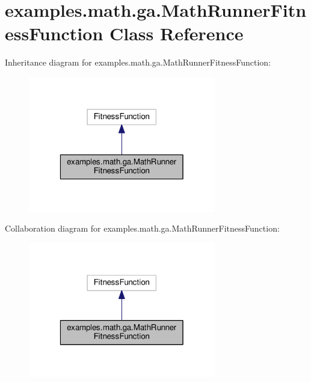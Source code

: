 \hypertarget{classexamples_1_1math_1_1ga_1_1_math_runner_fitness_function}{\section{examples.\-math.\-ga.\-Math\-Runner\-Fitness\-Function Class Reference}
\label{classexamples_1_1math_1_1ga_1_1_math_runner_fitness_function}
}


Inheritance diagram for examples.\-math.\-ga.\-Math\-Runner\-Fitness\-Function\-:
\nopagebreak
\begin{figure}[H]
\begin{center}
\leavevmode
\includegraphics[width=232pt]{classexamples_1_1math_1_1ga_1_1_math_runner_fitness_function__inherit__graph}
\end{center}
\end{figure}


Collaboration diagram for examples.\-math.\-ga.\-Math\-Runner\-Fitness\-Function\-:
\nopagebreak
\begin{figure}[H]
\begin{center}
\leavevmode
\includegraphics[width=232pt]{classexamples_1_1math_1_1ga_1_1_math_runner_fitness_function__coll__graph}
\end{center}
\end{figure}
